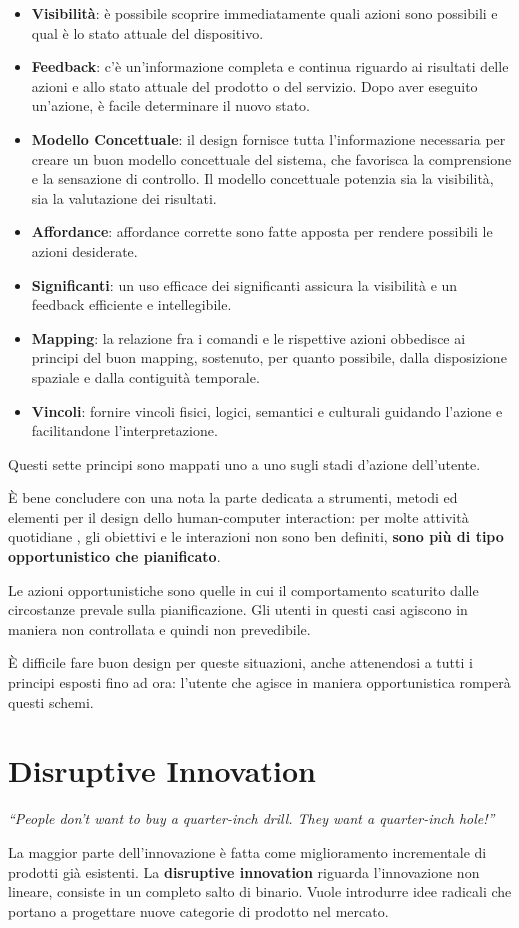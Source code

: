 \documentclass[a4paper,11pt,oneside]{book}
\begin{document}
\begin{itemize}
	\item \textbf{Visibilità}: è possibile scoprire immediatamente quali azioni sono possibili e qual è lo stato attuale del dispositivo.
	\item \textbf{Feedback}: c'è un'informazione completa e continua riguardo ai risultati delle azioni e allo stato attuale del prodotto o del servizio. Dopo aver eseguito un'azione, è facile determinare il nuovo stato.
	\item \textbf{Modello Concettuale}: il design fornisce tutta l'informazione necessaria per creare un buon modello concettuale del sistema, che favorisca la comprensione e la sensazione di controllo. Il modello concettuale potenzia sia la visibilità, sia la valutazione dei risultati.
	\item \textbf{Affordance}: affordance corrette sono fatte apposta per rendere possibili le azioni desiderate.
	\item \textbf{Significanti}: un uso efficace dei significanti assicura la visibilità e un feedback efficiente e intellegibile.
	\item \textbf{Mapping}: la relazione  fra i comandi e le rispettive azioni obbedisce ai principi del buon mapping, sostenuto, per quanto possibile, dalla disposizione spaziale e dalla contiguità temporale.
	\item \textbf{Vincoli}: fornire vincoli fisici, logici, semantici e culturali guidando l'azione e facilitandone l'interpretazione.
\end{itemize}
Questi sette principi sono mappati uno a uno sugli stadi d'azione dell'utente.

È bene concludere con una nota la parte dedicata a strumenti, metodi ed elementi per il design dello human-computer interaction: per molte attività quotidiane , gli obiettivi e le interazioni non sono ben definiti, \textbf{sono più di tipo opportunistico che pianificato}.

Le azioni opportunistiche sono quelle in cui il comportamento scaturito dalle circostanze prevale sulla pianificazione. Gli utenti in questi casi agiscono in maniera non controllata e quindi non prevedibile.

È difficile fare buon design per queste situazioni, anche attenendosi a tutti i principi esposti fino ad ora: l'utente che agisce in maniera opportunistica romperà questi schemi.

\pagebreak

\section{Disruptive Innovation}
\begin{flushleft}
	\textit{“People don’t want to buy a quarter-inch drill. They want a quarter-inch hole!”}
\end{flushleft}
La maggior parte dell'innovazione è fatta come miglioramento incrementale di prodotti già esistenti. La \textbf{disruptive innovation} riguarda l'innovazione non lineare, consiste in un completo salto di binario. Vuole introdurre idee radicali che portano a progettare nuove categorie di prodotto nel mercato.
\end{document}
